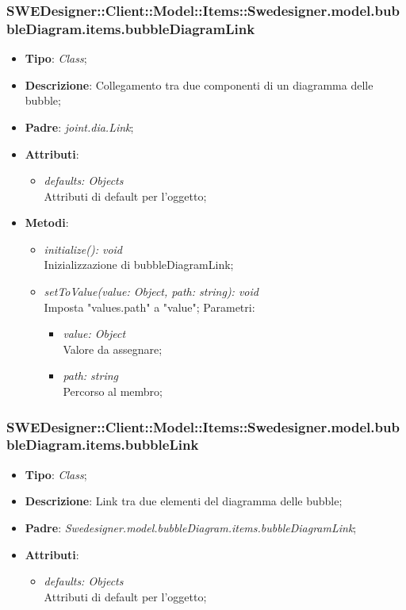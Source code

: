 \documentclass[../DefinizioneDiProdotto.tex]{subfiles}
\begin{document}
			\subsubsection{SWEDesigner::Client::Model::Items::Swedesigner.model.bubbleDiagram.items.bubbleDiagramLink}
			\hypertarget{SWEDesigner::Client::Model::Items::Swedesigner.model.bubbleDiagram.items.bubbleDiagramLink}{}
			\begin{itemize}
				\item \textbf{Tipo}: \emph{Class};
				\item \textbf{Descrizione}: Collegamento tra due componenti di un diagramma delle bubble;
				\item \textbf{Padre}: \emph{joint.dia.Link};
				\item \textbf{Attributi}:
				\begin{itemize}
					\item \emph{defaults: Objects}\\
					Attributi di default per l'oggetto;
				\end{itemize}
				\item \textbf{Metodi}:
				\begin{itemize}
					\item \emph{initialize(): void}\\
					Inizializzazione di bubbleDiagramLink;
					\item \emph{setToValue(value: Object, path: string): void}\\
					Imposta "values.path" a "value";
					Parametri:
					\begin{itemize}
						\item \emph{value: Object} \\
						Valore da assegnare;
						\item \emph{path: string} \\
						Percorso al membro;
					\end{itemize}
				\end{itemize}
			\end{itemize}
			
			\subsubsection{SWEDesigner::Client::Model::Items::Swedesigner.model.bubbleDiagram.items.bubbleLink}
			\hypertarget{SWEDesigner::Client::Model::Items::Swedesigner.model.bubbleDiagram.items.bubbleLink}{}
			\begin{itemize}
				\item \textbf{Tipo}: \emph{Class};
				\item \textbf{Descrizione}: Link tra due elementi del diagramma delle bubble;
				\item \textbf{Padre}: \emph{Swedesigner.model.bubbleDiagram.items.bubbleDiagramLink};
				\item \textbf{Attributi}:
				\begin{itemize}
					\item \emph{defaults: Objects}\\
					Attributi di default per l'oggetto;
				\end{itemize}\
			\end{itemize}
					
\end{document}

